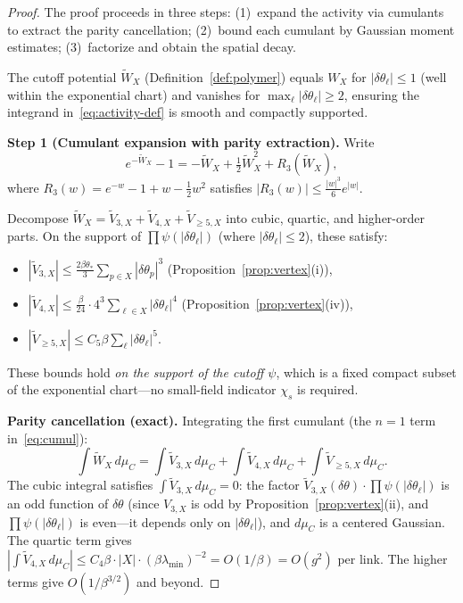 \documentclass[11pt]{article}
\theoremstyle{definition}
\begin{document}
\begin{proof}
The proof proceeds in three steps: (1)~expand the activity via
cumulants to extract the parity cancellation;
(2)~bound each cumulant by Gaussian moment estimates;
(3)~factorize and obtain the spatial decay.

The cutoff potential $\widetilde{W}_X$
(Definition~\ref{def:polymer}) equals $W_X$ for
$|\delta\theta_\ell|\le 1$ (well within the exponential chart) and
vanishes for $\max_\ell|\delta\theta_\ell|\ge 2$, ensuring the
integrand in~\eqref{eq:activity-def} is smooth and compactly
supported.

\textbf{Step 1 (Cumulant expansion with parity extraction).}
Write
\begin{equation}\label{eq:cumul}
e^{-\widetilde{W}_X}-1
=-\widetilde{W}_X+\tfrac{1}{2}\widetilde{W}_X^2+R_3(\widetilde{W}_X),
\end{equation}
where $R_3(w)=e^{-w}-1+w-\tfrac{1}{2}w^2$ satisfies
$|R_3(w)|\le\frac{|w|^3}{6}e^{|w|}$.

Decompose $\widetilde{W}_X=\widetilde{V}_{3,X}+\widetilde{V}_{4,X}
+\widetilde{V}_{\ge 5,X}$
into cubic, quartic, and higher-order parts.  On the support of
$\prod\psi(|\delta\theta_\ell|)$ (where $|\delta\theta_\ell|\le 2$),
these satisfy:
\begin{itemize}[nosep]
\item $|\widetilde{V}_{3,X}|\le\frac{2\beta\theta_*}{3}
\sum_{p\in X}|\delta\theta_p|^3$ (Proposition~\ref{prop:vertex}(i)),
\item $|\widetilde{V}_{4,X}|\le\frac{\beta}{24}\cdot 4^3
\sum_{\ell\in X}|\delta\theta_\ell|^4$
(Proposition~\ref{prop:vertex}(iv)),
\item $|\widetilde{V}_{\ge 5,X}|\le C_5\beta
\sum_\ell|\delta\theta_\ell|^5$.
\end{itemize}
These bounds hold \emph{on the support of the cutoff $\psi$}, which
is a fixed compact subset of the exponential chart---no small-field
indicator $\chi_s$ is required.

\textbf{Parity cancellation (exact).}
Integrating the first cumulant (the $n=1$ term in~\eqref{eq:cumul}):
\begin{equation}
\int\widetilde{W}_X\,d\mu_C
=\int\widetilde{V}_{3,X}\,d\mu_C
+\int\widetilde{V}_{4,X}\,d\mu_C
+\int\widetilde{V}_{\ge 5,X}\,d\mu_C.
\end{equation}
The cubic integral satisfies
$\int\widetilde{V}_{3,X}\,d\mu_C=0$: the factor
$\widetilde{V}_{3,X}(\delta\theta)\cdot\prod\psi(|\delta\theta_\ell|)$
is an odd function of $\delta\theta$ (since $V_{3,X}$ is odd
by Proposition~\ref{prop:vertex}(ii), and
$\prod\psi(|\delta\theta_\ell|)$ is even---it depends only on
$|\delta\theta_\ell|$), and $d\mu_C$ is a centered Gaussian.
The quartic term gives
$|\int\widetilde{V}_{4,X}\,d\mu_C|
\le C_4\beta\cdot|X|\cdot(\beta\lambda_{\min})^{-2}
=O(1/\beta)=O(g^2)$ per link.
The higher terms give $O(1/\beta^{3/2})$ and beyond.


\end{proof}
\end{document}
